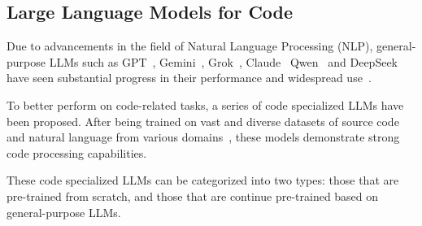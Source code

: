\subsection{Large Language Models for Code}
Due to advancements in the field of Natural Language Processing (NLP), general-purpose LLMs such as GPT~\cite{gpt4.1}, Gemini~\cite{gemini2.5}, Grok~\cite{grok}, Claude~\cite{claude} Qwen~\cite{hui2024qwen25codertechnicalreport} and DeepSeek~\cite{deepseek} have seen substantial progress in their performance and widespread use~\cite{brown2020language}.

To better perform on code-related tasks, a series of code specialized LLMs have been proposed. After being trained on vast and diverse datasets of source code and natural language from various domains~\cite{dai2015semi}, these models demonstrate strong code processing capabilities.

These code specialized LLMs can be categorized into two types: those that are pre-trained from scratch, and those that are continue pre-trained based on general-purpose LLMs.

